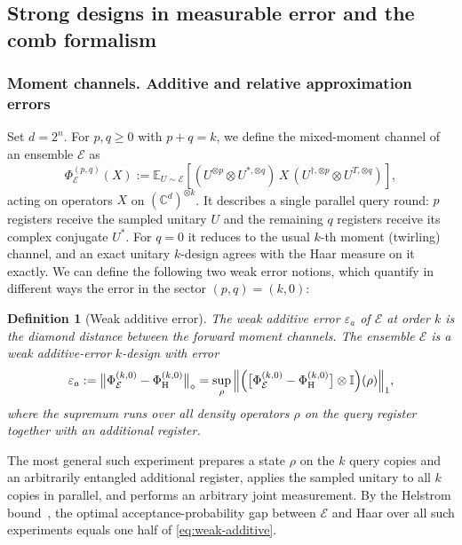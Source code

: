 \documentclass[
    aps,
    superscriptaddress,
    onecolumn,
    10pt,
    prx,
    nofootinbib
]{revtex4-2}
\newtheorem{definition}{Definition}
\newcommand{\Haar}{\mathrm H}
\newcommand{\E}{\mathbb E}
\newcommand{\cE}{\mathcal E}
\theoremstyle{namedstatement}
\theoremstyle{plain}
\begin{document}
\subsection{Strong designs in measurable error and the comb formalism}\label{app:definitions}


\subsubsection{Moment channels. Additive and relative approximation errors}
Set \(d=2^n\).  For \(p,q\geq0\) with \(p+q=k\), we define the mixed-moment channel of an ensemble $\mathcal{E}$ as
\begin{equation}\label{eq:mixed-twirl}
 \Phi_{\cE}^{(p,q)}(X)
 :=\E_{U\sim\cE}\!\left[
 (U^{\otimes p}\otimes U^{*,\otimes q})\,X\,
 (U^{\dagger,\otimes p}\otimes U^{T,\otimes q})
 \right],
\end{equation}
acting on operators \(X\) on \((\mathbb{C}^{d})^{\otimes k}\). It describes a single parallel query round: \(p\) registers receive the sampled unitary \(U\) and the remaining \(q\) registers receive its complex conjugate \(U^{*}\).  For \(q=0\) it reduces to the usual \(k\)-th moment (twirling) channel, and an exact unitary \(k\)-design agrees with the Haar measure on it exactly. We can define the following two weak error notions, which quantify in different ways the error in the sector \((p,q)=(k,0)\):
 
\begin{definition}[Weak additive error]\label{def:weak-additive-error}
The \emph{weak additive error} $\varepsilon_a$ of \(\cE\) at order \(k\) is the diamond distance between the forward moment channels.
The ensemble \(\cE\) is a \emph{weak additive-error \(k\)-design} with error
\begin{equation}\label{eq:weak-additive}
 \varepsilon_a
 :=\bigl\|\Phi_{\cE}^{(k,0)}-\Phi_{\Haar}^{(k,0)}\bigr\|_{\diamond}
 =\sup_{\rho}\,
 \Bigl\|\Bigl(\bigl[\Phi_{\cE}^{(k,0)}-\Phi_{\Haar}^{(k,0)}\bigr]\otimes\mathbb{I}\Bigr)(\rho)\Bigr\|_{1},
\end{equation}
where the supremum runs over all density operators \(\rho\) on the query register together with an additional register.
\end{definition}
The most general such experiment prepares a state \(\rho\) on the \(k\) query copies and an arbitrarily entangled additional register, applies the sampled unitary to all \(k\) copies in parallel, and performs an arbitrary joint measurement.  By the Helstrom bound~\cite{Helstrom1976}, the optimal acceptance-probability gap between \(\cE\) and Haar over all such experiments equals one half of \cref{eq:weak-additive}.
\end{document}

